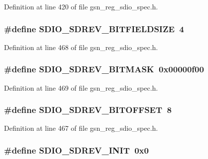 Definition at line 420 of file gsn\_\-reg\_\-sdio\_\-spec.h.

\hypertarget{a00571_a276e42f08fcf2eb14218bd285c7ebc32}{
\subsubsection[{SDIO\_\-SDREV\_\-BITFIELDSIZE}]{\setlength{\rightskip}{0pt plus 5cm}\#define SDIO\_\-SDREV\_\-BITFIELDSIZE~4}}
\label{a00571_a276e42f08fcf2eb14218bd285c7ebc32}


Definition at line 468 of file gsn\_\-reg\_\-sdio\_\-spec.h.

\hypertarget{a00571_a29ee33e2e2a4171fecdc4e2bdce07de5}{
\subsubsection[{SDIO\_\-SDREV\_\-BITMASK}]{\setlength{\rightskip}{0pt plus 5cm}\#define SDIO\_\-SDREV\_\-BITMASK~0x00000f00}}
\label{a00571_a29ee33e2e2a4171fecdc4e2bdce07de5}


Definition at line 469 of file gsn\_\-reg\_\-sdio\_\-spec.h.

\hypertarget{a00571_abd4b9eccfbf2043e2138a04b212982a1}{
\subsubsection[{SDIO\_\-SDREV\_\-BITOFFSET}]{\setlength{\rightskip}{0pt plus 5cm}\#define SDIO\_\-SDREV\_\-BITOFFSET~8}}
\label{a00571_abd4b9eccfbf2043e2138a04b212982a1}


Definition at line 467 of file gsn\_\-reg\_\-sdio\_\-spec.h.

\hypertarget{a00571_aea27d3bce850ba3f85b5ad3ec4fbf8a7}{
\subsubsection[{SDIO\_\-SDREV\_\-INIT}]{\setlength{\rightskip}{0pt plus 5cm}\#define SDIO\_\-SDREV\_\-INIT~0x0}}
\label{a00571_aea27d3bce850ba3f85b5ad3ec4fbf8a7}


